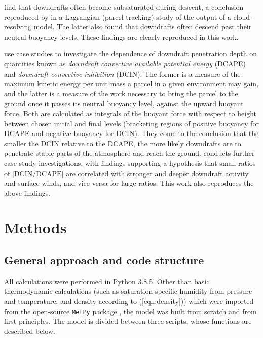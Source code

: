 \documentclass[12pt,titlepage]{article}
\newcommand{\dcape}{\mathrm{DCAPE}}
\newcommand{\dcin}{\mathrm{DCIN}}
\begin{document}
\textcite{knupp_cotton_1985} find that downdrafts often become
subsaturated during descent, a conclusion reproduced by
\textcite{thayer-calder_2013} in a Lagrangian (parcel-tracking)
study of the output of a cloud-resolving model. The latter also found
that downdrafts often descend past their neutral buoyancy levels.
These findings are clearly reproduced in this work.

\textcite{market_2017} use case studies to investigate the dependence
of downdraft
penetration depth on quantities known as \emph{downdraft convective
available potential energy} (DCAPE) and \emph{downdraft convective
inhibition} (DCIN). The former is a measure of the maximum kinetic
energy per unit mass a parcel in a given environment may gain,
and the latter is a measure of the work necessary to bring the parcel
to the ground once it passes its neutral buoyancy level, against
the upward buoyant force. Both are calculated as integrals of the
buoyant force with respect to height between chosen initial and final
levels (bracketing
regions of positive buoyancy for DCAPE and negative buoyancy for DCIN).
They come to the conclusion that the smaller
the DCIN relative to the DCAPE, the more likely downdrafts are to
penetrate stable parts of the atmosphere and reach the ground.
\textcite{sumrall_2020} conducts further case study investigations,
with findings supporting a hypothesis that small ratios of
$|\dcin/\dcape|$ are correlated with stronger and deeper downdraft
activity and surface winds, and vice versa for large ratios.
This work also reproduces the above findings.



\section{Methods} \label{section:methods}
\subsection{General approach and code structure}
All calculations were performed in Python 3.8.5. Other than
basic thermodynamic calculations (such as saturation specific humidity
from pressure and temperature, and density according to
(\ref{eqn:density})) which were imported from the open-source
\verb|MetPy| package \parencite{metpy}, the model was built from
scratch and from first principles. The model is divided between
three scripts, whose functions are described below.
\end{document}
